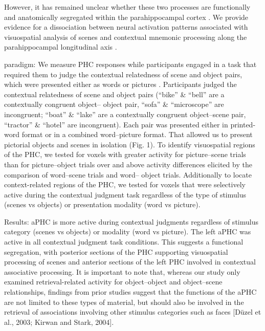 \documentclass[english]{article}
\begin{document}
%
However, it has remained unclear whether these two processes are functionally
and anatomically segregated within the parahippocampal cortex
\citep{baumann2016functional}.
%
We provide evidence for a dissociation between neural activation patterns
associated with visuospatial analysis of scenes and contextual mnemonic
processing along the parahippocampal longitudinal axis
\citep{baumann2016functional}.

%
\citep{baumann2016functional} paradigm: We measure PHC responses while
participants engaged in a task that required them to judge the contextual
relatedness of scene and object pairs, which were presented either as words or
pictures \citep{baumann2016functional}.
%
Participants judged the contextual relatedness of scene and object pairs (“bike”
\& “bell” are a contextually congruent object– object pair, “sofa” \&
“microscope” are incongruent; “boat” \& “lake” are a contextually congruent
object–scene pair, “tractor” \& “hotel” are
incongruent)\citep{baumann2016functional}.
%
Each pair was presented either in printed-word format or in a combined
word–picture format. That allowed us to present pictorial objects and scenes in
isolation (Fig. 1)\citep{baumann2016functional}.
%
To identify visuospatial regions of the PHC, we tested for voxels with greater
activity for picture–scene trials than for picture–object trials over and above
activity differences elicited by the comparison of word–scene trials and word–
object trials\citep{baumann2016functional}.
%
Additionally to locate context-related regions of the PHC, we tested for voxels
that were selectively active during the contextual judgment task regardless of
the type of stimulus (scenes vs objects) or presentation modality (word vs
picture)\citep{baumann2016functional}.

%
Results: aPHC is more active during contextual judgments regardless of stimulus
category (scenes vs objects) or modality (word vs picture).
%
The left aPHC was active in all contextual judgment task conditions. This
suggests a functional segregation, with posterior sections of the PHC supporting
visuospatial processing of scenes and anterior sections of the left PHC involved
in contextual associative processing\citep{baumann2016functional}.
%
It is important to note that, whereas our study only examined retrieval-related
activity for object–object and object–scene relationships, findings from prior
studies suggest that the functions of the aPHC are not limited to these types of
material, but should also be involved in the retrieval of associations involving
other stimulus categories such as faces [Düzel et al., 2003; Kirwan and Stark,
2004]\citep{baumann2016functional}.
\end{document}
